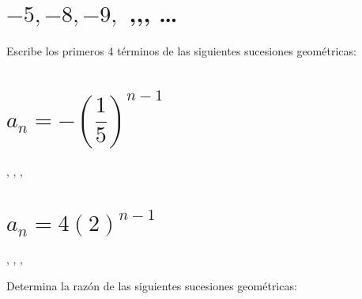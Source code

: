 \documentclass[12pt,addpoints]{evalua}
\begin{document}
\begin{questions}
\begin{multicols}{2}
\begin{parts}
            \begin{solutionbox}{3cm}
            \end{solutionbox}

            \part {\Large $-5,-8,-9,$ \fillin[-8][0.5cm],\fillin[-5][0.5cm],\fillin[0][0.5cm], \dots}

            \begin{solutionbox}{3cm}
            \end{solutionbox}

        \end{parts}
    \end{multicols}


    \question[6] Escribe los primeros 4 términos de las siguientes sucesiones geométricas:
    \begin{multicols}{2}
        \begin{parts}
            \part { \Large$a_{n}=-\left( \dfrac{1}{5}\right)^{n-1}$}

            \begin{solutionbox}{2cm}
                \fillin[$-1$][0cm], \fillin[$-\dfrac{1}{5}$][0cm], \fillin[$-\dfrac{1}{25}$][0cm], \fillin[$-\dfrac{1}{125}$][0cm]
            \end{solutionbox}

            \part { \Large$a_{n}=4\left( 2\right)^{n-1}$}

            \begin{solutionbox}{2cm}
                \fillin[$4$][0cm], \fillin[$8$][0cm], \fillin[$16$][0cm], \fillin[$32$][0cm]
            \end{solutionbox}
        \end{parts}
    \end{multicols}

    \question[6] Determina la razón de las siguientes sucesiones geométricas:
    \begin{multicols}{2}
        \begin{parts}

\end{parts}
\end{multicols}
\end{questions}
\end{document}
